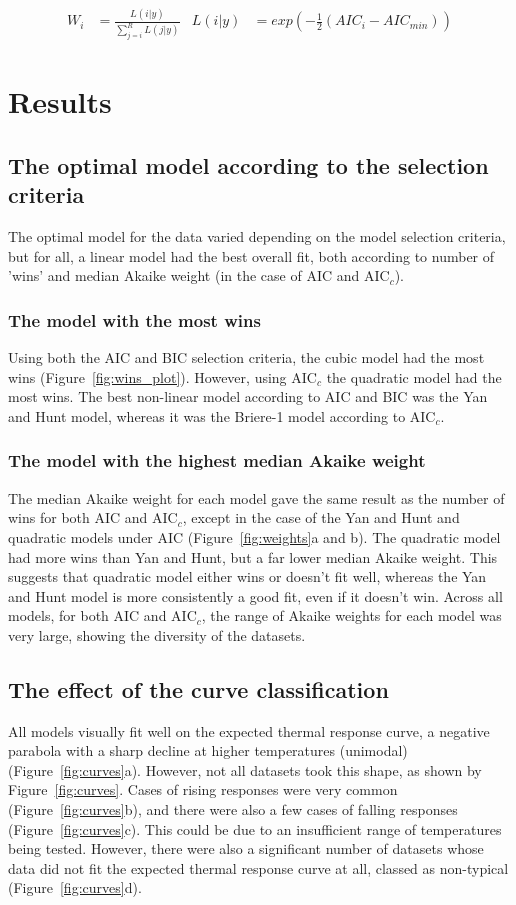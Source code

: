 \documentclass[11pt, a4paper]{article}
\begin{document}
	\begin{align} \label{eg:weights}
	W_i &= \frac{L(i | y)}{\sum_{j = i}^{R}L(j | y) }
	& L(i | y) &= exp(-\frac{1}{2} (AIC_i - AIC_{min})) 
	\end{align}
	
\section{Results}

\subsection{The optimal model according to the selection criteria}
The optimal model for the data varied depending on the model selection criteria, but for all, a linear model had the best overall fit, both according to number of 'wins' and median Akaike weight (in the case of AIC and AIC$_c$).

\subsubsection*{The model with the most wins}
Using both the AIC and BIC selection criteria, the cubic model had the most wins (Figure~\ref{fig:wins_plot}). However, using AIC$_c$ the quadratic model had the most wins. The best non-linear model according to AIC and BIC was the Yan and Hunt model, whereas it was the Briere-1 model according to AIC$_c$.

\subsubsection*{The model with the highest median Akaike weight}
The median Akaike weight for each model gave the same result as the number of wins for both AIC and AIC$_c$, except in the case of the Yan and Hunt and quadratic models under AIC (Figure~\ref{fig:weights}a and b). The quadratic model had more wins than Yan and Hunt, but a far lower median Akaike weight. This suggests that quadratic model either wins or doesn't fit well, whereas the Yan and Hunt model is more consistently a good fit, even if it doesn't win. Across all models, for both AIC and AIC$_c$, the range of Akaike weights for each model was very large, showing the diversity of the datasets.

\subsection{The effect of the curve classification}
All models visually fit well on the expected thermal response curve, a negative parabola with a sharp decline at higher temperatures (unimodal) (Figure~\ref{fig:curves}a). However, not all datasets took this shape, as shown by Figure~\ref{fig:curves}. Cases of rising responses were very common (Figure~\ref{fig:curves}b), and there were also a few cases of falling responses (Figure~\ref{fig:curves}c). This could be due to an insufficient range of temperatures being tested. However, there were also a significant number of datasets whose data did not fit the expected thermal response curve at all, classed as non-typical (Figure~\ref{fig:curves}d).
\end{document}
